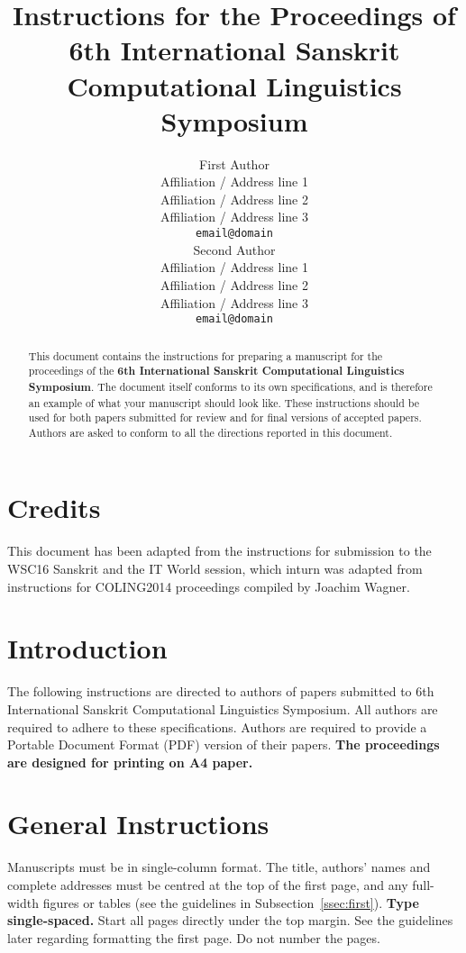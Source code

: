 \documentclass[11pt]{article}
\title{Instructions for the Proceedings of \\6th International Sanskrit Computational Linguistics Symposium}
\author{First Author \\
  Affiliation / Address line 1 \\
  Affiliation / Address line 2 \\
  Affiliation / Address line 3 \\
  {\tt email@domain} \\\And
  Second Author \\
  Affiliation / Address line 1 \\
  Affiliation / Address line 2 \\
  Affiliation / Address line 3 \\
  {\tt email@domain} \\}
\date{}
\begin{document}
\maketitle
\begin{abstract}
  This document contains the instructions for preparing a
  manuscript for the proceedings of the \textbf{6th International Sanskrit Computational Linguistics Symposium}. 
  The document itself
  conforms to its own specifications, and is therefore an example of
  what your manuscript should look like. These instructions should be
  used for both papers submitted for review and for final versions of
  accepted papers.  Authors are asked to conform to all the directions
  reported in this document.
\end{abstract}

\section{Credits}

This document has been adapted from the instructions for submission to the WSC16 Sanskrit
and the IT World session, which inturn was adapted from instructions for  COLING2014
proceedings compiled by Joachim Wagner. 

\section{Introduction}
\label{intro}

%
% 
\blfootnote{
}

The following instructions are directed to authors of papers submitted
to 6th International Sanskrit Computational Linguistics Symposium.  All
authors are required to adhere to these specifications. Authors are
required to provide a Portable Document Format (PDF) version of their
papers. \textbf{The proceedings are designed for printing on A4
  paper.}

\section{General Instructions}

Manuscripts must be in single-column format.
The title, authors' names and complete
addresses
must be centred at the top of the first page, and
any full-width figures or tables (see the guidelines in
Subsection~\ref{ssec:first}). {\bf Type single-spaced.}  Start all
pages directly under the top margin. See the guidelines later
regarding formatting the first page.  
Do not number the pages.
\end{document}
